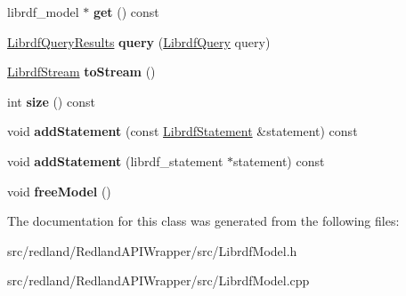 \begin{DoxyCompactItemize}
librdf\+\_\+model $\ast$ {\bfseries get} () const
\item 
\mbox{\label{classredland_1_1LibrdfModel_a29e79bafe40a64141ab7edf8ecbbbdd3}} 
\hyperlink{classredland_1_1LibrdfQueryResults}{Librdf\+Query\+Results} {\bfseries query} (\hyperlink{classredland_1_1LibrdfQuery}{Librdf\+Query} query)
\item 
\mbox{\label{classredland_1_1LibrdfModel_a646ed92896c4030de31c9e17b881bd2a}} 
\hyperlink{classredland_1_1LibrdfStream}{Librdf\+Stream} {\bfseries to\+Stream} ()
\item 
\mbox{\label{classredland_1_1LibrdfModel_a3067eb5bae1353ab5c86f135c4b401ad}} 
int {\bfseries size} () const
\item 
\mbox{\label{classredland_1_1LibrdfModel_a2b565a7d705e24d6163c068a40040087}} 
void {\bfseries add\+Statement} (const \hyperlink{classredland_1_1LibrdfStatement}{Librdf\+Statement} \&statement) const
\item 
\mbox{\label{classredland_1_1LibrdfModel_a643c3e3d3363f4f06330ede73dc19514}} 
void {\bfseries add\+Statement} (librdf\+\_\+statement $\ast$statement) const
\item 
\mbox{\label{classredland_1_1LibrdfModel_ad145b8f46be49434bb8bd0b90a904770}} 
void {\bfseries free\+Model} ()
\end{DoxyCompactItemize}


The documentation for this class was generated from the following files\+:\begin{DoxyCompactItemize}
\item 
src/redland/\+Redland\+A\+P\+I\+Wrapper/src/Librdf\+Model.\+h\item 
src/redland/\+Redland\+A\+P\+I\+Wrapper/src/Librdf\+Model.\+cpp\end{DoxyCompactItemize}

